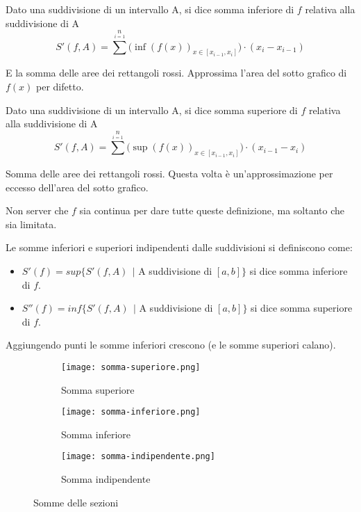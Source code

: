 \begin{definition}
Dato una suddivisione di un intervallo A, si dice somma inferiore di $f$ relativa alla suddivisione di A 
\vspace{-5pt}
\[S'(f,A) = \sum^n\limits_{i=1} \big( \inf(f(x))_{x \in [x_{i-1}, x_i]} \big) \cdot (x_i - x_{i - 1})\]
\end{definition}
E la somma delle aree dei rettangoli rossi. Approssima l'area del sotto grafico di $f(x)$ per difetto.
\begin{definition}
Dato una suddivisione di un intervallo A, si dice somma superiore di $f$ relativa alla suddivisione di A 
\vspace{-5pt}
\[S'(f,A) = \sum^n\limits_{i=1} \big( \sup(f(x))_{x \in [x_{i-1}, x_i]} \big) \cdot (x_{i-1} - x_i)\]
\end{definition}
Somma delle aree dei rettangoli rossi. Questa volta è un'approssimazione per eccesso dell'area del sotto grafico.
\begin{observation}
Non server che $f$ sia continua per dare tutte queste definizione, ma soltanto che sia limitata.
\end{observation}
\begin{definition}
Le somme inferiori e superiori indipendenti dalle suddivisioni si definiscono come:
\begin{itemize}
    \item $S'(f) = sup\{S'(f,A) \:\: |$ A suddivisione di $[a,b]\}$ si dice somma inferiore di $f$.
    \item $S''(f) = inf\{S'(f,A) \:\: |$ A suddivisione di $[a,b]\}$ si dice somma superiore di $f$.
\end{itemize}
\end{definition}
Aggiungendo punti le somme inferiori crescono (e le somme superiori calano).

\begin{figure}[h!]
    \begin{subfigure}{.3\textwidth}
        \centering
        \texttt{[image: somma-superiore.png]}
        \caption{Somma superiore}
    \end{subfigure}
    \begin{subfigure}{.3\textwidth}
        \centering
        \texttt{[image: somma-inferiore.png]}
        \caption{Somma inferiore}
    \end{subfigure}
    \begin{subfigure}{.3\textwidth}
        \centering
        \texttt{[image: somma-indipendente.png]}
        \caption{Somma indipendente}
    \end{subfigure}
    \caption{Somme delle sezioni}
\end{figure}


